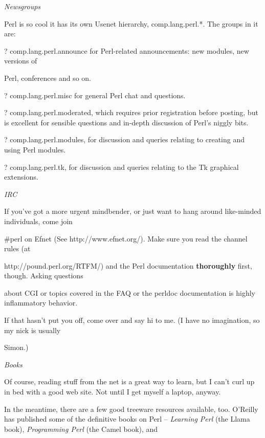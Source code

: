 \documentclass[a4paper,11pt]{book}
\begin{document}
\noindent 

\noindent \textit{Newsgroups}

\noindent Perl is so cool it has its own Usenet hierarchy, comp.lang.perl.*. The groups in it are:

\noindent 

\noindent ? comp.lang.perl.announce for Perl-related announcements: new modules, new versions of

\noindent Perl, conferences and so on.

\noindent ? comp.lang.perl.misc for general Perl chat and questions.

\noindent ? comp.lang.perl.moderated, which requires prior registration before posting, but is excellent for sensible questions and in-depth discussion of Perl's niggly bits.

\noindent ? comp.lang.perl.modules, for discussion and queries relating to creating and using Perl modules.

\noindent ? comp.lang.perl.tk, for discussion and queries relating to the Tk graphical extensions.

\noindent 

\noindent \textit{IRC}

\noindent If you've got a more urgent mindbender, or just want to hang around like-minded individuals, come join

\noindent \#perl on Efnet (See http://www.efnet.org/). Make sure you read the channel rules (at

\noindent http://pound.perl.org/RTFM/) and the Perl documentation \textbf{thoroughly }first, though. Asking questions

\noindent about CGI or topics covered in the FAQ or the perldoc documentation is highly inflammatory behavior.

\noindent 

\noindent If that hasn't put you off, come over and say hi to me. (I have no imagination, so my nick is usually

\noindent Simon.)

\noindent 

\noindent \textit{Books}

\noindent Of course, reading stuff from the net is a great way to learn, but I can't curl up in bed with a good web site. Not until I get myself a laptop, anyway.

\noindent 

\noindent In the meantime, there are a few good treeware resources available, too. O'Reilly has published some of the definitive books on Perl -- \textit{Learning Perl }(the Llama book), \textit{Programming Perl }(the Camel book), and
\end{document}
